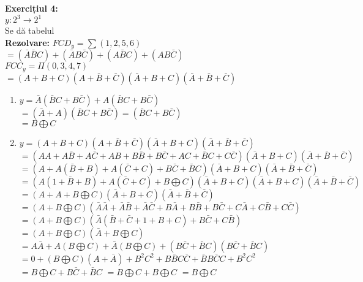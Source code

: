 \documentclass[12pt]{article}
\begin{document}
\begin{figure}[h!]
    \begin{minipage}{0.7\textwidth}
        \textbf{Exercițiul 4:\\}
        $y:2^3\rightarrow2^1$\\
        Se dă tabelul\\
        \textbf{Rezolvare:}
        $FCD_{y}=\sum(1,2,5,6) $\\
        $=(\bar{A}\bar{B}C)+(\bar{A}B\bar{C})+ (A\bar{B}C)+(AB\bar{C})$\\
        $FCC_{y}=\Pi(0,3,4,7)$\\
        $=(A+B+C)(A+\bar{B}+\bar{C})(\bar{A}+B+C)(\bar{A}+\bar{B}+\bar{C})$\\
        \begin{enumerate}[label=(\alph*)]
            \item {
                $y=\bar{A}(\bar{B}C+B\bar{C})+A(\bar{B}C+B\bar{C})$\\
                $ = (\bar{A}+A)(\bar{B}C+B\bar{C})=(\bar{B}C+B\bar{C})$\\
                $ = B\bigoplus C$
            }
            \item {
                $y=(A+B+C)(A+\bar{B}+\bar{C})(\bar{A}+B+C)(\bar{A}+\bar{B}+\bar{C})$\\
                $ =(AA+A\bar{B}+A\bar{C}+AB+B\bar{B}+B\bar{C}+AC+\bar{B}C+C\bar{C})(\bar{A}+B+C)(\bar{A}+\bar{B}+\bar{C})$\\
                $ =(A+A(\bar{B}+B)+A(\bar{C}+C)+B\bar{C}+\bar{B}C)(\bar{A}+B+C)(\bar{A}+\bar{B}+\bar{C})$
                $ =(A(1+\bar{B}+B)+A(\bar{C}+C)+ B\bigoplus C)(\bar{A}+B+C)(\bar{A}+B+C)(\bar{A}+\bar{B}+\bar{C})$
                $ =(A+A+B\bigoplus C)(\bar{A}+B+C)(\bar{A}+\bar{B}+\bar{C})$
                $ =(A+B\bigoplus C)(\bar{A}\bar{A}+\bar{A}\bar{B}+\bar{A}\bar{C}+B\bar{A}+B\bar{B}+B\bar{C}+C\bar{A}+C\bar{B}+C\bar{C})$
                $ =(A+B\bigoplus C)(\bar{A}(\bar{B}+\bar{C}+1+B+C)+B\bar{C}+C\bar{B})$
                $ =(A+B\bigoplus C)(\bar{A}+B\bigoplus C)$
                $ =A\bar{A}+A(B\bigoplus C)+\bar{A}(B\bigoplus C)+(B\bar{C}+\bar{B}C)(B\bar{C}+\bar{B}C)$
                $ =0+(B\bigoplus C)(A+\bar{A})+B^2C^2+B\bar{B}C\bar{C}+\bar{B}B\bar{C}C+B^2C^2$
                $ =B\bigoplus C +B\bar{C}+\bar{B}C$
                $ =B\bigoplus C + B\bigoplus C$
                $ =B\bigoplus C$
            }
        \end{enumerate}
    \end{minipage}
    \hfill
    \begin{minipage}{0.2\textwidth}

\end{minipage}
\end{figure}
\end{document}
